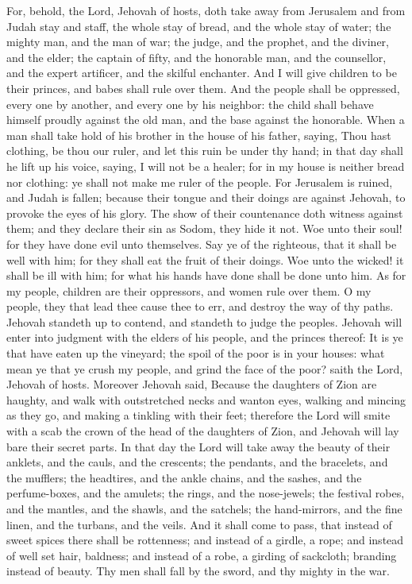 For, behold, the Lord, Jehovah of hosts, doth take away from Jerusalem and from Judah stay and staff, the whole stay of bread, and the whole stay of water; the mighty man, and the man of war; the judge, and the prophet, and the diviner, and the elder; the captain of fifty, and the honorable man, and the counsellor, and the expert artificer, and the skilful enchanter. And I will give children to be their princes, and babes shall rule over them. And the people shall be oppressed, every one by another, and every one by his neighbor: the child shall behave himself proudly against the old man, and the base against the honorable. When a man shall take hold of his brother in the house of his father, saying, Thou hast clothing, be thou our ruler, and let this ruin be under thy hand; in that day shall he lift up his voice, saying, I will not be a healer; for in my house is neither bread nor clothing: ye shall not make me ruler of the people. For Jerusalem is ruined, and Judah is fallen; because their tongue and their doings are against Jehovah, to provoke the eyes of his glory. The show of their countenance doth witness against them; and they declare their sin as Sodom, they hide it not. Woe unto their soul! for they have done evil unto themselves. Say ye of the righteous, that it shall be well with him; for they shall eat the fruit of their doings. Woe unto the wicked! it shall be ill with him; for what his hands have done shall be done unto him. As for my people, children are their oppressors, and women rule over them. O my people, they that lead thee cause thee to err, and destroy the way of thy paths.  Jehovah standeth up to contend, and standeth to judge the peoples. Jehovah will enter into judgment with the elders of his people, and the princes thereof: It is ye that have eaten up the vineyard; the spoil of the poor is in your houses: what mean ye that ye crush my people, and grind the face of the poor? saith the Lord, Jehovah of hosts.  Moreover Jehovah said, Because the daughters of Zion are haughty, and walk with outstretched necks and wanton eyes, walking and mincing as they go, and making a tinkling with their feet; therefore the Lord will smite with a scab the crown of the head of the daughters of Zion, and Jehovah will lay bare their secret parts. In that day the Lord will take away the beauty of their anklets, and the cauls, and the crescents; the pendants, and the bracelets, and the mufflers; the headtires, and the ankle chains, and the sashes, and the perfume-boxes, and the amulets; the rings, and the nose-jewels; the festival robes, and the mantles, and the shawls, and the satchels; the hand-mirrors, and the fine linen, and the turbans, and the veils. And it shall come to pass, that instead of sweet spices there shall be rottenness; and instead of a girdle, a rope; and instead of well set hair, baldness; and instead of a robe, a girding of sackcloth; branding instead of beauty. Thy men shall fall by the sword, and thy mighty in the war. 
